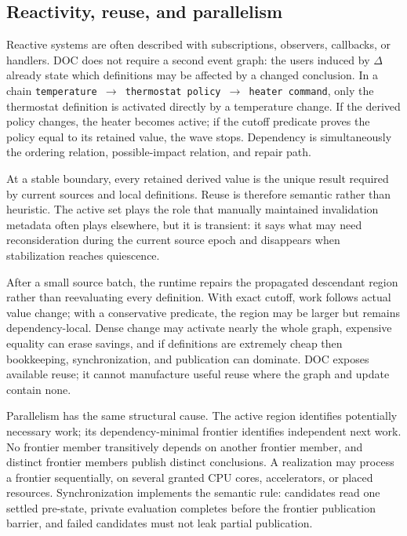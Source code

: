 \subsection{Reactivity, reuse, and parallelism}
Reactive systems are often described with subscriptions, observers, callbacks, or handlers. DOC does not require a second event graph: the users induced by $\Delta$ already state which definitions may be affected by a changed conclusion. In a chain \texttt{temperature $\to$ thermostat policy $\to$ heater command}, only the thermostat definition is activated directly by a temperature change. If the derived policy changes, the heater becomes active; if the cutoff predicate proves the policy equal to its retained value, the wave stops. Dependency is simultaneously the ordering relation, possible-impact relation, and repair path.

At a stable boundary, every retained derived value is the unique result required by current sources and local definitions. Reuse is therefore semantic rather than heuristic. The active set plays the role that manually maintained invalidation metadata often plays elsewhere, but it is transient: it says what may need reconsideration during the current source epoch and disappears when stabilization reaches quiescence.

After a small source batch, the runtime repairs the propagated descendant region rather than reevaluating every definition. With exact cutoff, work follows actual value change; with a conservative predicate, the region may be larger but remains dependency-local. Dense change may activate nearly the whole graph, expensive equality can erase savings, and if definitions are extremely cheap then bookkeeping, synchronization, and publication can dominate. DOC exposes available reuse; it cannot manufacture useful reuse where the graph and update contain none.

Parallelism has the same structural cause. The active region identifies potentially necessary work; its dependency-minimal frontier identifies independent next work. No frontier member transitively depends on another frontier member, and distinct frontier members publish distinct conclusions. A realization may process a frontier sequentially, on several granted CPU cores, accelerators, or placed resources. Synchronization implements the semantic rule: candidates read one settled pre-state, private evaluation completes before the frontier publication barrier, and failed candidates must not leak partial publication.

